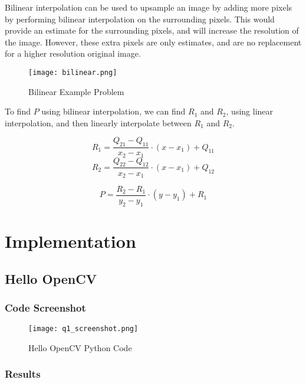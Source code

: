 \documentclass[12pt, letterpaper]{article}
\begin{document}
Bilinear interpolation can be used to upsample an image by adding more pixels by performing bilinear interpolation on the surrounding pixels. This would provide an estimate for the surrounding pixels, and will increase the resolution of the image. However, these extra pixels are only estimates, and are no replacement for a higher resolution original image.






\begin{figure}[h]
    \centering
    \texttt{[image: bilinear.png]}
    \caption{Bilinear Example Problem}
    \label{fig:bilinear}
\end{figure}



To find $P$ using bilinear interpolation, we can find $R_1$ and $R_2$, using linear interpolation, and then linearly interpolate between $R_1$ and $R_2$.

\[R_1 = \frac{Q_{21} - Q_{11}}{x_2-x_1} \cdot (x - x_1) + Q_{11}\]
\[R_2 = \frac{Q_{22} - Q_{12}}{x_2-x_1} \cdot (x - x_1) + Q_{12}  \]

\[P = \frac{R_2 - R_1}{y_2-y_1} \cdot (y - y_1) + R_1 \]


\section{Implementation}

\subsection{Hello OpenCV}

\subsubsection{Code Screenshot}
\begin{figure}[H]
    \centering
    \texttt{[image: q1\_screenshot.png]}
    \caption{Hello OpenCV Python Code}
\end{figure}

\subsubsection{Results}
\end{document}
